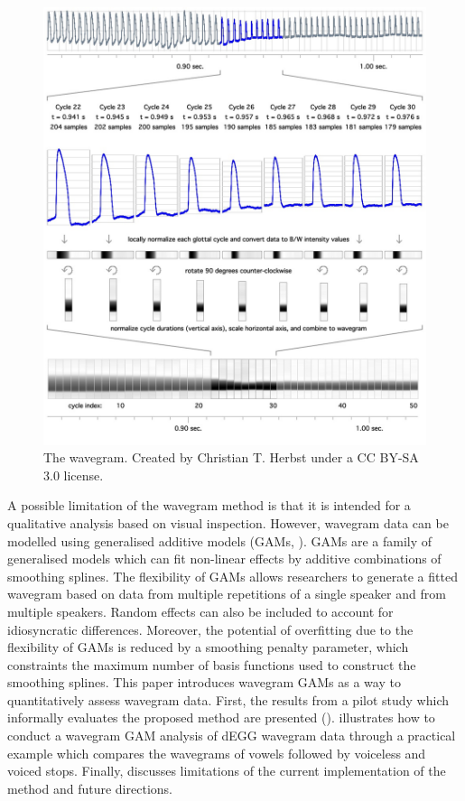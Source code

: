 \documentclass[12pt,a4paper,]{article}
\begin{document}
\begin{figure}
  \includegraphics{./img/wavegram.png}
  \caption{The wavegram. Created by Christian T. Herbst under a CC BY-SA 3.0 license.}
  \label{f:wavegram}
\end{figure}

A possible limitation of the wavegram method is that it is intended for
a qualitative analysis based on visual inspection. However, wavegram
data can be modelled using generalised additive models (GAMs,
\citealt{hastie1986, zuur2012, wood2017}). GAMs are a family of
generalised models which can fit non-linear effects by additive
combinations of smoothing splines. The flexibility of GAMs allows
researchers to generate a fitted wavegram based on data from multiple
repetitions of a single speaker and from multiple speakers. Random
effects can also be included to account for idiosyncratic differences.
Moreover, the potential of overfitting due to the flexibility of GAMs is
reduced by a smoothing penalty parameter, which constraints the maximum
number of basis functions used to construct the smoothing splines. This
paper introduces wavegram GAMs as a way to quantitatively assess
wavegram data. First, the results from a pilot study which informally
evaluates the proposed method are presented ().
 illustrates how to conduct a wavegram GAM analysis of
dEGG wavegram data through a practical example which compares the
wavegrams of vowels followed by voiceless and voiced stops. Finally,
 discusses limitations of the current implementation of
the method and future directions.
\end{document}
